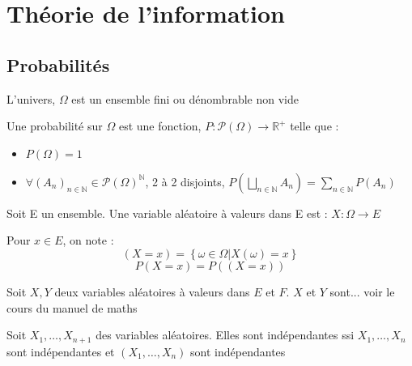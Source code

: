 \chapter{Théorie de l'information}
\section{Probabilités}

\begin{definition}[L'univers]
    L'univers, \(\Omega \) est un ensemble fini ou dénombrable non vide 
\end{definition}

\begin{definition}
    Une probabilité sur \(\Omega \) est une fonction, \(P : \mathcal{P}(\Omega ) \to \mathbb{R}^{+}\) telle que :
    \begin{itemize}
        \item \(P(\Omega ) = 1\) 
        \item  \(\forall (A_{n})_{n \in \mathbb{N}} \in \mathcal{P }(\Omega)^{\mathbb{N}}\), 2 à 2 disjoints, \(P(\bigsqcup _{n \in \mathbb{N}}A_{n}) = \sum _{n \in \mathbb{N}} P(A_{n})\) 
    \end{itemize}  
\end{definition}

\begin{definition}
    Soit E un ensemble. Une variable aléatoire à valeurs dans E est : \(X: \Omega  \to E\) 
\end{definition}

\begin{notation}
    Pour \(x \in E\), on note : 
    \[
        (X=x) =  \left\{ \omega \in  \Omega | X(\omega ) = x  \right\}
    \] 
    \[
        P(X=x) = P((X=x))
    \]
\end{notation}

\begin{definition}
    Soit \(X,Y\) deux variables aléatoires à valeurs dans \(E\) et \(F \). \(X\) et \(Y\) sont... voir le cours du manuel de maths
\end{definition}

\begin{remark}[Indépendances]
    Soit \(X_{1}, \dots, X_{n+1}\) des variables aléatoires. Elles sont indépendantes ssi \(X_{1},\dots,X_{n}\) sont indépendantes et \((X_{1},\dots,X_{n})\) sont indépendantes
\end{remark}

